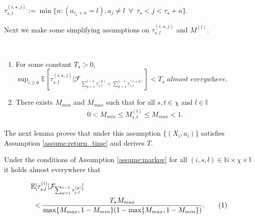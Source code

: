 \documentclass[opre,sglanonrev]{informs4}
\numberwithin{equation}{section}
\newcommand{\pow}[1]{^{(#1)}}
\newcommand{\Ibb}{\mathbb{I}}
\newcommand{\Nbb}{\mathbb{N}}
\newcommand{\Fcal}{\mathcal{F}}
\newcommand{\naturalset}{\Nbb}
\newcommand\numberthis{\addtocounter{equation}{1}\tag{\theequation}}
\newcommand{\expec}{\mathbb{E}}
\begin{document}
{{\begin{definition}
\begin{small}
$\tau_{s,l}\pow{i,\star,j}:= \min\{n:(a_{\tau_\star+n}=l),a_{j}\neq l\enspace\forall \enspace \tau_\star<j<\tau_\star+n\}.
$
\end{small}
\end{definition}
Next we make some simplifying assumptions on $\tau_{s,l}\pow{i,\star,j}$ and $M\pow{l}$.
\begin{assumption}~\label{assume:markov}
\begin{enumerate}
    \item For some constant $T_\star>0$,
    $
    \sup_{i\geq 0} \expec[\tau_{s,l}\pow{i,\star,j}|\Fcal_{\sum_{p=1}^{i-1} \tau_{s,l}\pow{p}+\sum_{p=1}^{j-1}\tau_{s,l}\pow{i,\star,p}}]< T_\star \textit{ almost everywhere.}
    $
    \item There exists $M_{min}$ and $M_{max}$ such that for all $s,t\in \chi$ and $l\in\Ibb$ 
    \begin{align}
    0<M_{min}\leq M_{s,t}\pow l\leq M_{max}<1.   \label{eq:markov-eq1}     
    \end{align}
\end{enumerate}
\end{assumption}
{ The next lemma proves that under this assumption $\{(X_i,a_i)\}$ satisfies Assumption \ref{assume:return_time} and derives $T$.}
\begin{lemma}\label{lemma:return-time-markov}
Under the conditions of Assumption \ref{assume:markov} for all $(i,s,l)\in\naturalset\times\chi\times\Ibb$ it holds almost everywhere that
\begin{small}
    \begin{align*}
    &\expec[\tau_{s,l}^{(i)}|\Fcal_{\sum_{p=1}^{i-1} \tau_{s,l}\pow{p}}]\\
    &\ <\frac{T_\star M_{max}}{\max\{M_{max},1-M_{min}\}(1-\max\{M_{max},1-M_{min}\})}.\numberthis\label{eq:markov-eq3}         
    \end{align*}
\end{small}
\end{lemma}

}}
\end{document}
